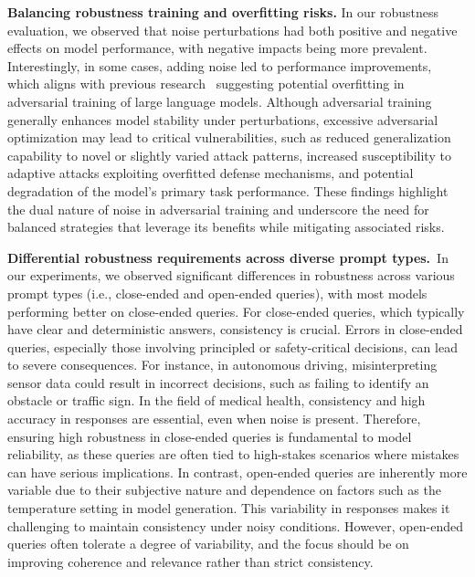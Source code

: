 \textbf{Balancing robustness training and overfitting risks.}
In our robustness evaluation, we observed that noise perturbations had both positive and negative effects on model performance, with negative impacts being more prevalent. Interestingly, in some cases, adding noise led to performance improvements, which aligns with previous research~\cite{li2020closer} suggesting potential overfitting in adversarial training of large language models. Although adversarial training generally enhances model stability under perturbations, excessive adversarial optimization may lead to critical vulnerabilities, such as reduced generalization capability to novel or slightly varied attack patterns, increased susceptibility to adaptive attacks exploiting overfitted defense mechanisms, and potential degradation of the model’s primary task performance.  These findings highlight the dual nature of noise in adversarial training and underscore the need for balanced strategies that leverage its benefits while mitigating associated risks.

\textbf{Differential robustness requirements across diverse prompt types.}~In our experiments, we observed significant differences in robustness across various prompt types (i.e., close-ended and open-ended queries), with most models performing better on close-ended queries.
For close-ended queries, which typically have clear and deterministic answers, consistency is crucial. Errors in close-ended queries, especially those involving principled or safety-critical decisions, can lead to severe consequences. For instance, in autonomous driving, misinterpreting sensor data could result in incorrect decisions, such as failing to identify an obstacle or traffic sign. In the field of medical health, consistency and high accuracy in responses are essential, even when noise is present. Therefore, ensuring high robustness in close-ended queries is fundamental to model reliability, as these queries are often tied to high-stakes scenarios where mistakes can have serious implications.
In contrast, open-ended queries are inherently more variable due to their subjective nature and dependence on factors such as the temperature setting in model generation. This variability in responses makes it challenging to maintain consistency under noisy conditions. However, open-ended queries often tolerate a degree of variability, and the focus should be on improving coherence and relevance rather than strict consistency.






